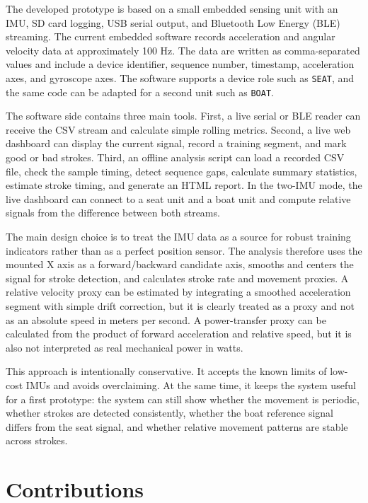 The developed prototype is based on a small embedded sensing unit with an IMU, SD card logging, USB serial output, and Bluetooth Low Energy (BLE) streaming. The current embedded software records acceleration and angular velocity data at approximately 100 Hz. The data are written as comma-separated values and include a device identifier, sequence number, timestamp, acceleration axes, and gyroscope axes. The software supports a device role such as \texttt{SEAT}, and the same code can be adapted for a second unit such as \texttt{BOAT}.

The software side contains three main tools. First, a live serial or BLE reader can receive the CSV stream and calculate simple rolling metrics. Second, a live web dashboard can display the current signal, record a training segment, and mark good or bad strokes. Third, an offline analysis script can load a recorded CSV file, check the sample timing, detect sequence gaps, calculate summary statistics, estimate stroke timing, and generate an HTML report. In the two-IMU mode, the live dashboard can connect to a seat unit and a boat unit and compute relative signals from the difference between both streams.

The main design choice is to treat the IMU data as a source for robust training indicators rather than as a perfect position sensor. The analysis therefore uses the mounted X axis as a forward/backward candidate axis, smooths and centers the signal for stroke detection, and calculates stroke rate and movement proxies. A relative velocity proxy can be estimated by integrating a smoothed acceleration segment with simple drift correction, but it is clearly treated as a proxy and not as an absolute speed in meters per second. A power-transfer proxy can be calculated from the product of forward acceleration and relative speed, but it is also not interpreted as real mechanical power in watts.

This approach is intentionally conservative. It accepts the known limits of low-cost IMUs and avoids overclaiming. At the same time, it keeps the system useful for a first prototype: the system can still show whether the movement is periodic, whether strokes are detected consistently, whether the boat reference signal differs from the seat signal, and whether relative movement patterns are stable across strokes.

\section{Contributions}

